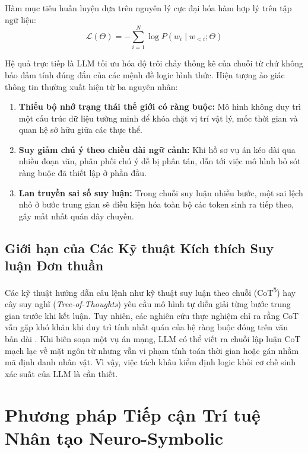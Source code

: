 Hàm mục tiêu huấn luyện dựa trên nguyên lý cực đại hóa hàm hợp lý trên tập ngữ liệu:
\begin{equation}
    \mathcal{L}(\Theta) = - \sum_{i=1}^N \log P(w_i \mid w_{<i}; \Theta)
\end{equation}

Hệ quả trực tiếp là LLM tối ưu hóa độ trôi chảy thống kê của chuỗi từ chứ không bảo đảm tính đúng đắn của các mệnh đề logic hình thức. Hiện tượng ảo giác thông tin thường xuất hiện từ ba nguyên nhân:
\begin{enumerate}[leftmargin=1.5cm]
    \item \textbf{Thiếu bộ nhớ trạng thái thế giới có ràng buộc:} Mô hình không duy trì một cấu trúc dữ liệu tường minh để khóa chặt vị trí vật lý, mốc thời gian và quan hệ sở hữu giữa các thực thể.
    \item \textbf{Suy giảm chú ý theo chiều dài ngữ cảnh:} Khi hồ sơ vụ án kéo dài qua nhiều đoạn văn, phân phối chú ý dễ bị phân tán, dẫn tới việc mô hình bỏ sót ràng buộc đã thiết lập ở phần đầu.
    \item \textbf{Lan truyền sai số suy luận:} Trong chuỗi suy luận nhiều bước, một sai lệch nhỏ ở bước trung gian sẽ điều kiện hóa toàn bộ các token sinh ra tiếp theo, gây mất nhất quán dây chuyền.
\end{enumerate}

\subsection{Giới hạn của Các Kỹ thuật Kích thích Suy luận Đơn thuần}
Các kỹ thuật hướng dẫn câu lệnh như kỹ thuật suy luận theo chuỗi (CoT\textsuperscript{5}) \cite{wei2022chain} hay cây suy nghĩ (\textit{Tree-of-Thoughts}) yêu cầu mô hình tự diễn giải từng bước trung gian trước khi kết luận. Tuy nhiên, các nghiên cứu thực nghiệm chỉ ra rằng CoT vẫn gặp khó khăn khi duy trì tính nhất quán của hệ ràng buộc đóng trên văn bản dài \cite{sprague2024musr, li2024contradoc}. Khi biên soạn một vụ án mạng, LLM có thể viết ra chuỗi lập luận CoT mạch lạc về mặt ngôn từ nhưng vẫn vi phạm tính toán thời gian hoặc gán nhầm mã định danh nhân vật. Vì vậy, việc tách khâu kiểm định logic khỏi cơ chế sinh xác suất của LLM là cần thiết.

\section{Phương pháp Tiếp cận Trí tuệ Nhân tạo Neuro-Symbolic}
\label{sec:theory_neurosymbolic}

